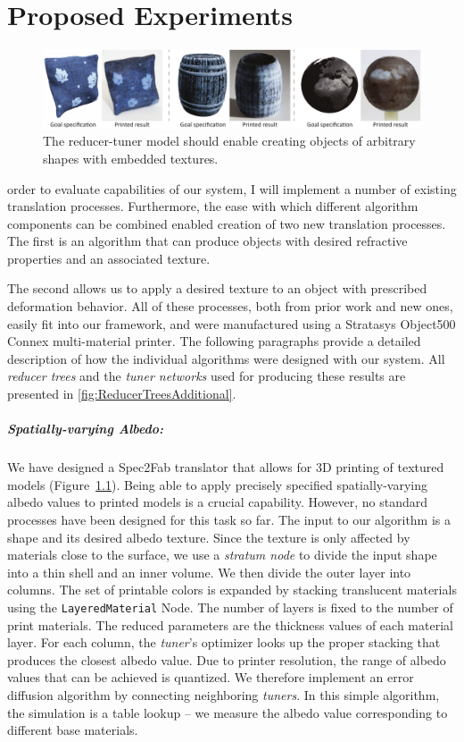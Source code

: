 \chapter{Proposed Experiments}
\label{chap:results}
\begin{figure}[t]
\includegraphics[width=\linewidth]{figure/TexturedExamples.pdf}
\caption {The reducer-tuner model should enable creating objects of arbitrary shapes with embedded textures.}
\label{fig:texturedExamples}
\end{figure}
 order to evaluate capabilities of our system, I will implement a number of existing translation processes.
Furthermore, the ease with which different algorithm components can be combined enabled creation of two new translation processes.
The first is an algorithm that can produce objects with desired refractive properties and an associated texture.

The second allows us to apply a desired texture to an object with prescribed deformation behavior.
All of these processes, both from prior work and new ones, easily fit into our framework, and were manufactured using a Stratasys Object500 Connex  multi-material printer.
The following paragraphs provide a detailed description of how the individual algorithms were designed with our system.
All \emph{reducer trees} and the \emph{tuner networks} used for producing these results are presented in \autoref{fig:ReducerTreesAdditional}.

\paragraph{Spatially-varying Albedo:}
We have designed a Spec2Fab translator that allows for 3D printing of textured models (Figure~\ref{fig:texturedExamples}).
Being able to apply precisely specified spatially-varying albedo values to printed models is a crucial capability.
However, no standard processes have been designed for this task so far. The input to our algorithm is a shape and its desired albedo texture. Since the texture is only affected by materials close to the surface, we use a \emph{stratum node} to divide the input shape into a thin shell and an inner volume. We then divide the outer layer into columns. The set of printable colors is expanded by stacking translucent materials using the \verb|LayeredMaterial| Node.
The number of layers is fixed to the number of print materials. The reduced parameters are the thickness values of each material layer. For each column, the \emph{tuner}'s optimizer looks up the proper stacking that produces the closest albedo value. Due to printer resolution, the range of albedo values that can be achieved is quantized. We therefore implement an error diffusion algorithm by connecting neighboring \emph{tuners}. In this simple algorithm, the simulation is a table lookup -- we measure the albedo value corresponding to different base materials.


